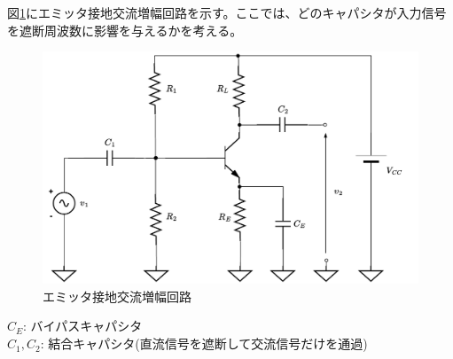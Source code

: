 図\ref{emit_kouryu}にエミッタ接地交流増幅回路を示す。ここでは、どのキャパシタが入力信号を遮断周波数に影響を与えるかを考える。
\begin{figure}[htbp]
  \begin{center}
  \includegraphics[width=0.68\linewidth]{img/45.pdf}
  \caption{エミッタ接地交流増幅回路}
  \label{emit_kouryu}
  \end{center}
\end{figure}

$C_{E}$: バイパスキャパシタ\\
$C_{1}, C_{2}$: 結合キャパシタ(直流信号を遮断して交流信号だけを通過)


